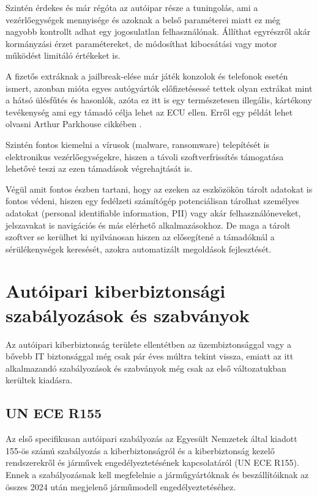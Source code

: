 Szintén érdekes és már régóta az autóipar része a tuningolás, ami a vezérlőegységek mennyisége és azoknak a belső paraméterei miatt ez még nagyobb kontrollt adhat egy jogosulatlan felhasználónak. Állíthat egyrészről akár kormányzási érzet paramétereket, de módosíthat kibocsátási vagy motor működést limitáló értékeket is.

A fizetős extráknak a jailbreak-elése már játék konzolok és telefonok esetén ismert, azonban mióta egyes autógyártók előfizetésessé tettek olyan extrákat mint a hátsó ülésfűtés és hasonlók, azóta ez itt is egy természetesen illegális, kártékony tevékenység ami egy támadó célja lehet az ECU ellen. Erről egy példát lehet olvasni Arthur Parkhouse cikkében \cite{tesla}.

Szintén fontos kiemelni a vírusok (malware, ransomware) telepítését is elektronikus vezérlőegységekre, hiszen a távoli szoftverfrissítés támogatása lehetővé teszi az ezen támadások végrehajtását is.

Végül amit fontos észben tartani, hogy az ezeken az eszközökön tárolt adatokat is fontos védeni, hiszen egy fedélzeti számítógép potenciálisan tárolhat személyes adatokat (personal identifiable information, PII) vagy akár felhasználóneveket, jelszavakat is navigációs és más elérhető alkalmazásokhoz. De maga a tárolt szoftver se kerülhet ki nyilvánosan hiszen az elősegítené a támadóknál a sérülékenységek keresését, azokra automatizált megoldások fejlesztését.


\section{Autóipari kiberbiztonsági szabályozások és szabványok}

Az autóipari kiberbiztonság területe ellentétben az üzembiztonsággal vagy a bővebb IT biztonsággal még csak pár éves múltra tekint vissza, emiatt az itt alkalmazandó szabályozások és szabványok még csak az első változatukban kerültek kiadásra. 

\subsection{UN ECE R155}
Az első specifikusan autóipari szabályozás az Egyesült Nemzetek által kiadott 155-ös számú szabályozás a kiberbiztonságról és a kiberbiztonság kezelő rendszerekről és járművek engedélyeztetésének kapcsolatáról (UN ECE R155\cite{R155}). Ennek a szabályozásnak kell megfelelnie a járműgyártóknak és beszállítóiknak az összes 2024 után megjelenő járműmodell engedélyeztetéséhez.

